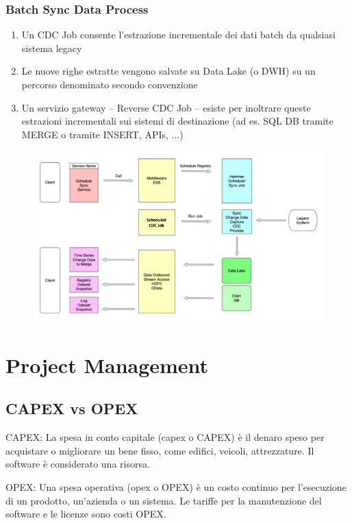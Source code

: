 \documentclass{article}
\begin{document}
\subsubsection{Batch Sync Data Process}
\begin{enumerate}
    \item Un CDC Job consente l'estrazione incrementale dei dati batch da qualsiasi sistema legacy
    \item Le nuove righe estratte vengono salvate su Data Lake (o DWH) su un percorso denominato secondo convenzione
    \item Un servizio gateway – Reverse CDC Job – esiste per inoltrare queste estrazioni incrementali sui sistemi di destinazione (ad es. SQL DB tramite MERGE o tramite INSERT, APIs, ...)
\end{enumerate}

\begin{figure}[htp]
    \centering
    \includegraphics[width=\linewidth]{fig/batch_sync_data_process.png}
    \label{fig:Batch Sync Data Process}
\end{figure}
\section{Project Management}
\subsection{CAPEX vs OPEX}
CAPEX: La spesa in conto capitale (capex o CAPEX) è il denaro speso per acquistare o migliorare un bene fisso, come edifici, veicoli, attrezzature. Il software è considerato una risorsa.

OPEX: Una spesa operativa (opex o OPEX) è un costo continuo per l'esecuzione di un prodotto, un'azienda o un sistema. Le tariffe per la manutenzione del software e le licenze sono costi OPEX.
\end{document}
